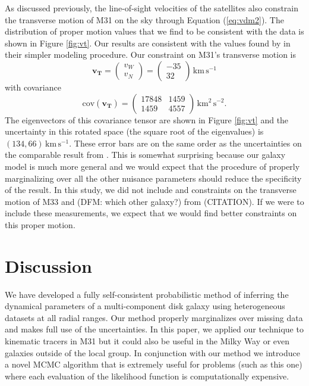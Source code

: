 \documentclass[preprint,12pt]{aastex}
\newcommand{\fig}[1]{Figure \ref{fig:#1}}
\newcommand{\eq}[1]{Equation (\ref{eq:#1})}
\newcommand{\bvec}[1]{\ensuremath{\boldsymbol{#1}}}
\newcommand{\unit}[1]{\,\mathrm{#1}}
\newcommand{\kms}{\unit{km\,s^{-1}}}
\begin{document}
As discussed previously, the line-of-sight velocities of the satellites also
constrain the transverse motion of M31 on the sky through \eq{vdm2}. The
distribution of proper motion values that we find to be consistent with the
data is shown in \fig{vt}. Our results are consistent with the values found
by \citet{vdm} in their simpler modeling procedure. Our constraint on
M31's transverse motion is
\begin{equation}
    \bvec{v_T} =
    \left ( \begin{array}{c}
        v_W \\ v_N
    \end{array} \right ) =
    \left ( \begin{array}{c}
        -35 \\ 32
    \end{array} \right ) \kms
\end{equation}
with covariance
\begin{equation}
    \mathrm{cov} (\bvec{v_T}) = \left ( \begin{array}{cc}
        17848 & 1459 \\
        1459  & 4557
    \end{array}\right ) \unit{km^2\, s^{-2}}.
\end{equation}
The eigenvectors of this covariance tensor are shown in \fig{vt} and the
uncertainty in this rotated space (the square root of the eigenvalues) is
$(134, 66) \kms$. These error bars are on the same order as the
uncertainties on the comparable result from \citet{vdm}. This is somewhat
surprising because our galaxy model is much more general and we
would expect that the procedure of properly marginalizing over all the
other nuisance parameters should reduce the specificity of the result.
In this study, we did not include and constraints on the transverse motion
of M33 and (DFM: which other galaxy?) from (CITATION). If we were to include
these measurements, we expect that we would find better constraints on this
proper motion.




\section{Discussion}

We have developed a fully self-consistent probabilistic method of inferring
the dynamical parameters of a multi-component disk galaxy using heterogeneous
datasets at all radial ranges. Our method properly marginalizes over missing
data and makes full use of the uncertainties. In this paper, we applied our
technique to kinematic tracers in M31 but it could also be useful in the
Milky Way or even galaxies outside of the local group. In conjunction with
our method we introduce a novel MCMC algorithm that is extremely useful for
problems (such as this one) where each evaluation of the likelihood function
is computationally expensive.
\end{document}

